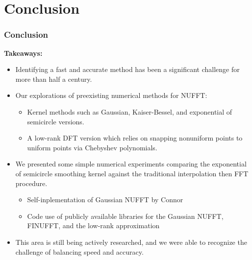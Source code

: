 \documentclass{beamer}
\begin{document}
\section{Conclusion}
\begin{frame}
  \frametitle{Conclusion}

  \textbf{Takeaways:}

 \begin{itemize}
   \item Identifying a fast and accurate method has been a significant challenge for more than half a century.
   \item Our explorations of preexisting numerical methods for NUFFT:
   \begin{itemize}
     \item Kernel methods such as Gaussian, Kaiser-Bessel, and exponential of semicircle versions.
     \item A low-rank DFT version which relies on snapping nonuniform points to uniform points via Chebyshev polynomials.
   \end{itemize}
   \item We presented some simple numerical experiments comparing the exponential of semicircle smoothing kernel against the traditional interpolation then FFT procedure.
   \begin{itemize}
     \item Self-inplementation of Gaussian NUFFT by Connor
     \item Code use of publicly available libraries for the Gaussian NUFFT, FINUFFT, and the low-rank approximation
   \end{itemize}
   \item This area is still being actively researched, and we were able to recognize the challenge of balancing speed and accuracy.
 \end{itemize}

\end{frame}
\end{document}
